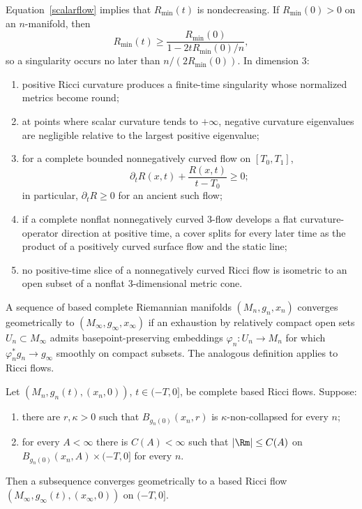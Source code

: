 Equation~\eqref{scalarflow} implies that $R_{\min}(t)$ is nondecreasing. If
$R_{\min}(0)>0$ on an $n$-manifold, then
\[
  R_{\min}(t)\geq
  \frac{R_{\min}(0)}{1-2tR_{\min}(0)/n},
\]
so a singularity occurs no later than $n/(2R_{\min}(0))$. In dimension $3$:
\begin{enumerate}
\item positive Ricci curvature produces a finite-time singularity whose
normalized metrics become round;
\item at points where scalar curvature tends to $+\infty$, negative curvature
eigenvalues are negligible relative to the largest positive eigenvalue;
\item for a complete bounded nonnegatively curved flow on $[T_0,T_1]$,
\[
  \partial_tR(x,t)+\frac{R(x,t)}{t-T_0}\geq0;
\]
in particular, $\partial_tR\geq0$ for an ancient such flow;
\item if a complete nonflat nonnegatively curved $3$-flow develops a flat
curvature-operator direction at positive time, a cover splits for every later
time as the product of a positively curved surface flow and the static line;
\item no positive-time slice of a nonnegatively curved Ricci flow is isometric
to an open subset of a nonflat $3$-dimensional metric cone.
\end{enumerate}

A sequence of based complete Riemannian manifolds
$(M_n,g_n,x_n)$ converges geometrically to
$(M_\infty,g_\infty,x_\infty)$ if an exhaustion by relatively compact open
sets $U_n\subset M_\infty$ admits basepoint-preserving embeddings
$\varphi_n:U_n\to M_n$ for which $\varphi_n^*g_n\to g_\infty$ smoothly on
compact subsets. The analogous definition applies to Ricci flows.

\begin{theorem}
\label{thm:compactness-based-ricci-flows}
Let $(M_n,g_n(t),(x_n,0))$, $t\in(-T,0]$, be complete based Ricci
flows. Suppose:
\begin{enumerate}
\item[(1)] there are $r,\kappa>0$ such that
$B_{g_n(0)}(x_n,r)$ is $\kappa$-non-collapsed for every $n$;
\item[(2)] for every $A<\infty$ there is $C(A)<\infty$ such that
$|\Rm|\leq C(A)$ on $B_{g_n(0)}(x_n,A)\times(-T,0]$ for every $n$.
\end{enumerate}
Then a subsequence converges geometrically to a based Ricci flow
$(M_\infty,g_\infty(t),(x_\infty,0))$ on $(-T,0]$.
\end{theorem}

